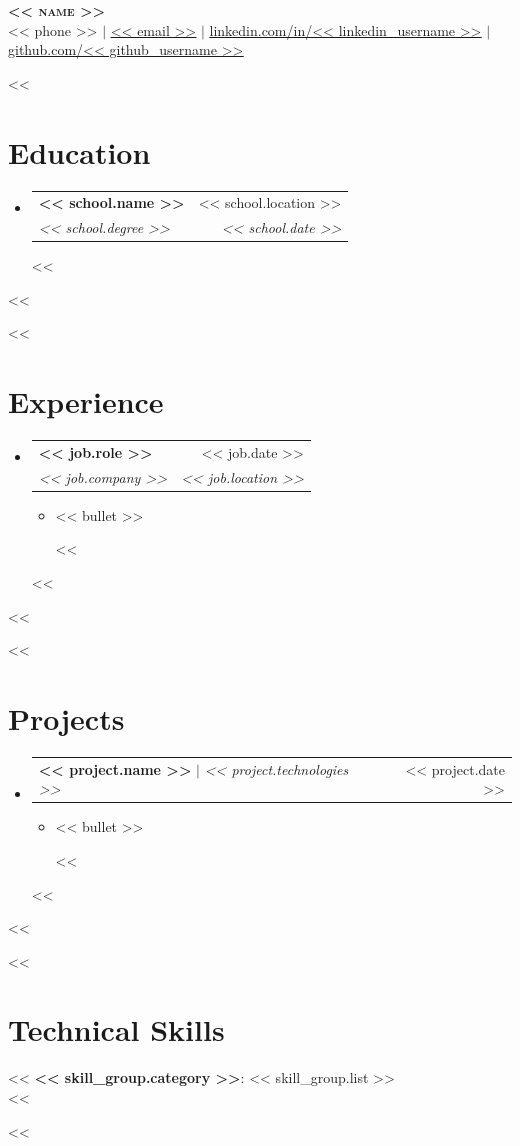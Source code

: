 \documentclass[letterpaper,11pt]{article}
\makeatletter
\newcommand{\resumeItem}[1]{
  \item\small{
    {#1 \vspace{-2pt}}
  }
}
\newcommand{\resumeSubheading}[4]{
  \vspace{-2pt}\item
    \begin{tabular*}{0.97\textwidth}[t]{l@{\extracolsep{\fill}}r}
      \textbf{#1} & #2 \\
      \textit{\small#3} & \textit{\small #4} \\
    \end{tabular*}\vspace{-7pt}
}
\newcommand{\resumeProjectHeading}[2]{
    \item
    \begin{tabular*}{0.97\textwidth}{l@{\extracolsep{\fill}}r}
      \small#1 & #2 \\
    \end{tabular*}\vspace{-7pt}
}
\newcommand{\resumeSubHeadingListStart}{\begin{itemize}[leftmargin=0.15in, label={}]}
\newcommand{\resumeSubHeadingListEnd}{\end{itemize}}
\newcommand{\resumeItemListStart}{\begin{itemize}}
\newcommand{\resumeItemListEnd}{\end{itemize}\vspace{-5pt}}
\makeatother
\begin{document}
\begin{center}
    \textbf{\Huge \scshape << name >>} \\ \vspace{1pt}
    \small << phone >> $|$ 
    \href{mailto:<< email >>}{\underline{<< email >>}} $|$ 
    \href{<< linkedin_url >>}{\underline{linkedin.com/in/<< linkedin_username >>}} $|$
    \href{<< github_url >>}{\underline{github.com/<< github_username >>}}
\end{center}

<<%
\section{Education}
  \resumeSubHeadingListStart
    <<%
      \resumeSubheading
        {<< school.name >>}{<< school.location >>}
        {<< school.degree >>}{<< school.date >>}
    <<%
  \resumeSubHeadingListEnd
<<%

<<%
\section{Experience}
  \resumeSubHeadingListStart
    <<%
    \resumeSubheading
      {<< job.role >>}{<< job.date >>}
      {<< job.company >>}{<< job.location >>}
      \resumeItemListStart
        <<%
        \resumeItem{<< bullet >>}
        <<%
      \resumeItemListEnd
    <<%
  \resumeSubHeadingListEnd
<<%

<<%
\section{Projects}
    \resumeSubHeadingListStart
      <<%
      \resumeProjectHeading
          {\textbf{<< project.name >>} $|$ \emph{<< project.technologies >>}}{<< project.date >>}
          \resumeItemListStart
            <<%
            \resumeItem{<< bullet >>}
            <<%
          \resumeItemListEnd
      <<%
    \resumeSubHeadingListEnd
<<%

<<%
\section{Technical Skills}
 \begin{itemize}[leftmargin=0.15in, label={}]
    \small{\item{
      <<%
      \textbf{<< skill_group.category >>}{: << skill_group.list >>} \\
      <<%
    }}
 \end{itemize}
<<%

\end{document}

